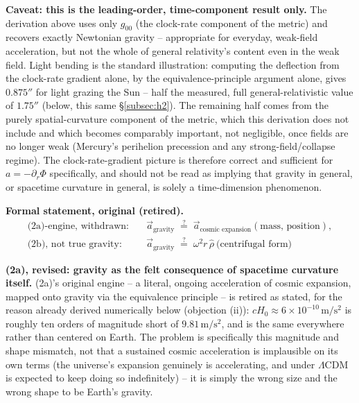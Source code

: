 \documentclass[12pt, a4paper]{article}
\begin{document}
\textbf{Caveat: this is the leading-order, time-component result
only.} The derivation above uses only $g_{00}$ (the clock-rate
component of the metric) and recovers exactly Newtonian gravity --
appropriate for everyday, weak-field acceleration, but not the whole
of general relativity's content even in the weak field. Light
bending is the standard illustration: computing the deflection from
the clock-rate gradient alone, by the equivalence-principle argument
alone, gives $0.875''$ for light grazing the Sun -- half the
measured, full general-relativistic value of $1.75''$ (below, this
same \S\ref{subsec:h2}). The remaining half comes from the purely
spatial-curvature component of the metric, which this derivation does
not include and which becomes comparably important, not negligible,
once fields are no longer weak (Mercury's perihelion precession and
any strong-field/collapse regime). The clock-rate-gradient picture is
therefore correct and sufficient for $a=-\partial_r\Phi$ specifically,
and should not be read as implying that gravity in general, or
spacetime curvature in general, is solely a time-dimension
phenomenon.

\textbf{Formal statement, original (retired).}
\begin{align*}
\text{(2a)-engine, withdrawn:} &\quad \vec a_{\text{gravity}} \;\overset{?}{=}\; \vec a_{\text{cosmic expansion}}(\text{mass, position}), \\
\text{(2b), not true gravity:} &\quad \vec a_{\text{gravity}} \;\overset{?}{=}\; \omega^2 r \,\hat\rho \ \text{(centrifugal form)}
\end{align*}

\textbf{(2a), revised: gravity as the felt consequence of spacetime
curvature itself.} (2a)'s original engine -- a literal, ongoing
acceleration of cosmic expansion, mapped onto gravity via the
equivalence principle -- is retired as stated, for the reason already
derived numerically below (objection (ii)): $cH_0\approx6\times10^{-10}
\,\mathrm{m/s^2}$ is roughly ten orders of magnitude short of
$9.81\,\mathrm{m/s^2}$, and is the same everywhere rather than
centered on Earth. The problem is specifically this magnitude and
shape mismatch, not that a sustained cosmic acceleration is
implausible on its own terms (the universe's expansion genuinely is
accelerating, and under $\Lambda$CDM is expected to keep doing so
indefinitely) -- it is simply the wrong size and the wrong shape to
be Earth's gravity.
\end{document}
